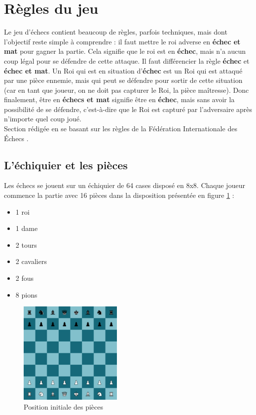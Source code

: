 \documentclass{article}
\begin{document}
\section{Règles du jeu}
Le jeu d'échecs contient beaucoup de règles, parfois techniques, mais dont l'objectif reste simple à comprendre :
il faut mettre le roi adverse en \textbf{échec et mat} pour gagner la partie. Cela signifie que le roi est en \textbf{échec},
mais n'a aucun coup légal pour se défendre de cette attaque. Il faut différencier la règle \textbf{échec} et 
\textbf{échec et mat}. Un Roi qui est en situation d'\textbf{échec} est un Roi qui est attaqué par une pièce
ennemie, mais qui peut se défendre pour sortir de cette situation (car en tant que joueur, on ne doit pas capturer le Roi,
la pièce maîtresse). Donc finalement, être en \textbf{échecs et mat} signifie être en \textbf{échec}, mais sans avoir
la possibilité de se défendre, c'est-à-dire que le Roi est capturé par l'adversaire après n'importe quel coup joué.\\
Section rédigée en se basant sur les règles de la Fédération Internationale des Échecs \cite{FIDE2021}.

\subsection{L'échiquier et les pièces}
Les échecs se jouent sur un échiquier de 64 cases disposé en 8x8. Chaque joueur commence la partie avec 16 pièces dans la disposition présentée en figure \ref{init} :
\begin{itemize}
    \item 1 roi
    \item 1 dame
    \item 2 tours
    \item 2 cavaliers
    \item 2 fous
    \item 8 pions
\end{itemize}

\begin{figure}[h]
    \centering
    \includegraphics[width=\textwidth,height=5.0cm,keepaspectratio]{jeuDepart.png}
    \caption{Position initiale des pièces}
    \label{init}
\end{figure}
\end{document}

